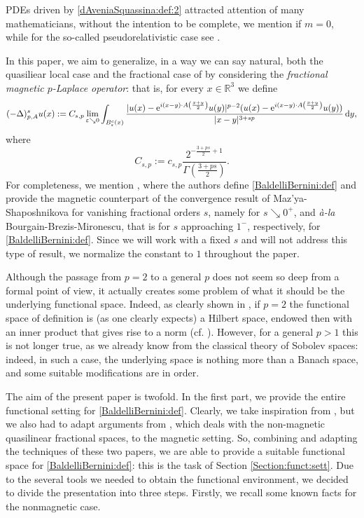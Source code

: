 \documentclass[leqno,11pt]{amsart}
\newcommand{\R}{\mathbb R}
\newcommand{\eps}{\varepsilon}
\numberwithin{equation}{section}
\def\e{{\rm e}}
\newcommand{\expAplus}{\e^{i(x-y)\cdot A\left(\frac{x+y}{2}\right)}}
\begin{document}
PDEs driven by \eqref{dAveniaSquassina:def:2} attracted attention of many mathematicians, without the intention to be complete, we mention \cite{AffiliValdinoci,Ambrosio2019-1,dAveniaSquassina, FiPiVe} if $m=0$, while for the so-called pseudorelativistic case see \cite{Ambrosio2016,BerninidAvenia,CiSe2018,FaFe,Secchi2019}.


\medskip


In this paper, we aim to generalize, in a way we can say natural, both the quasiliear local case and the fractional case of \cite{dAveniaSquassina} by considering the \textit{fractional magnetic $p$-Laplace operator}: that is, 
for every $x \in \R^3$ we define
\begin{equation}
\label{BaldelliBernini:def}
    (-\Delta)^s_{p,A}u(x):=C_{s,p} \lim_{\eps \searrow 0} \int_{B_\eps^c(x)} \frac{|u(x) - \expAplus u(y)|^{p-2}(u(x)-\expAplus u(y))}{|x-y|^{3+sp}} \dd y,
\end{equation}
where
\begin{equation}\label{csp}
    C_{s,p}:= c_{s,p}\frac{2^{-\frac{3+ps}{2}+1}}{\Gamma\left(\frac{3+ps}{2}\right)}.
\end{equation}
For completeness, we mention \cite{PinamontiSquassinaVecchi:s:to:0}, \cite{PinamontiSquassinaVecchia:s:to:1} where the authors define \eqref{BaldelliBernini:def} and provide the magnetic counterpart of the convergence result of Maz’ya-Shaposhnikova for vanishing fractional orders $s$, namely for $s\searrow 0^+$, and \textit{\`a-la} Bourgain-Brezis-Mironescu, that is for $s$ approaching $1^-$, respectively, for \eqref{BaldelliBernini:def}.
Since we will work with a fixed $s$ and will not address this type of result, we normalize the constant to $1$ throughout the paper.

Although the passage from $p=2$ to a general $p$ does not seem so deep from a formal point of view, it actually creates some problem of what it should be the underlying functional space. Indeed, as clearly shown in \cite{dAveniaSquassina}, if $p=2$ the functional space of definition is (as one clearly expects) a Hilbert space, endowed then with an inner product that gives rise to a norm (cf. \cite[Proposition 2.1]{dAveniaSquassina}). However, for a general $p>1$ this is not longer true, as we already know from the classical theory of Sobolev spaces: indeed, in such a case, the underlying space is nothing more than a Banach space, and some suitable modifications are in order.
\medskip

The aim of the present paper is twofold. In the first part, we provide the entire functional setting for \eqref{BaldelliBernini:def}. 
Clearly, we take inspiration from \cite{dAveniaSquassina}, but we also had to adapt arguments from \cite{BrascoGV}, which deals with the non-magnetic quasilinear fractional spaces, to the magnetic setting. So, combining and adapting the techniques of these two papers, we are able to provide a suitable functional space for \eqref{BaldelliBernini:def}: this is the task of Section \ref{Section:funct:sett}. Due to the several tools we needed to obtain the functional environment, we decided to divide the presentation into three steps. Firstly, we recall some known facts for the nonmagnetic case.
\end{document}
